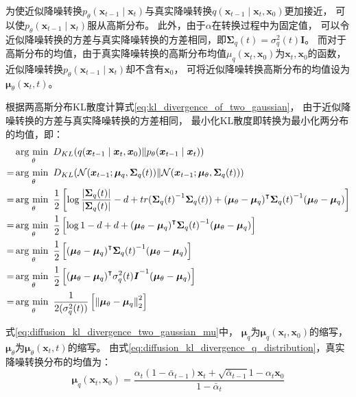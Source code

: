 为使近似降噪转换{$p_{\theta}(\bm{x}_{t-1}\mid \bm{x}_{t})$}与真实降噪转换{$q(\bm{x}_{t-1}\mid \bm{x}_{t},\bm{x}_{0})$}更加接近，
可以使{$p_{\theta}(\bm{x}_{t-1}\mid \bm{x}_{t})$}服从高斯分布。
此外，由于{$\alpha$}在转换过程中为固定值，
可以令近似降噪转换的方差与真实降噪转换的方差相同，即{$\bm{\Sigma}_{q}(t)= \sigma_{q}^{2}(t)\bm{I}$}。
而对于高斯分布的均值，由于真实降噪转换的高斯分布均值{$\mu_{q}(\bm{x}_{t},\bm{x}_{0})$}为{$\bm{x}_{t},\bm{x}_{0}$}的函数，
近似降噪转换{$p_{\theta}(\bm{x}_{t-1}\mid \bm{x}_{t})$}却不含有{$\bm{x}_{0}$}，
可将近似降噪转换高斯分布的均值设为{$\bm{\mu}_{\theta}(\bm{x}_{t},t)$}。

根据两高斯分布KL散度计算式{\ref{eq:kl_divergence_of_two_gaussian}}，
由于近似降噪转换的方差与真实降噪转换的方差相同，
最小化KL散度即转换为最小化两分布的均值，即：
\begin{align}
    &\argmin_{\theta} D_{KL}(q(\bm{x}_{t-1}\mid \bm{x}_{t},\bm{x}_{0}) \Vert p_{\theta}(\bm{x}_{t-1}\mid \bm{x}_{t})  )
    \\=& \argmin_{\theta}  D_{KL}(\mathcal{N}(\bm{x}_{t-1};\bm{\mu}_{q},\bm{\Sigma}_{q}(t))\Vert \mathcal{N}(\bm{x}_{t-1};\bm{\mu}_{\theta},\bm{\Sigma}_{q}(t)))
    \\=& \argmin_{\theta}  \frac{1}{2}\left[
        \log \frac{\left|  \bm{\Sigma}_{q}(t) \right|}{\left|  \bm{\Sigma}_{q}(t) \right|}
        - d
        +tr({\bm{\Sigma}_{q}(t)}^{-1}\bm{\Sigma}_{q}(t))
        +{(\bm{\mu}_{\theta}-\bm{\mu}_{q})}^{\intercal}{\bm{\Sigma}_{q}(t)}^{-1}(\bm{\mu}_{\theta}-\bm{\mu}_{q})
    \right]
    \\=& \argmin_{\theta}  \frac{1}{2}\left[\log 1 -d +d + {(\bm{\mu}_{\theta}-\bm{\mu}_{q})}^{\intercal}{\bm{\Sigma}_{q}(t)}^{-1}(\bm{\mu}_{\theta}-\bm{\mu}_{q})\right]
    \\=& \argmin_{\theta}  \frac{1}{2}\left[{(\bm{\mu}_{\theta}-\bm{\mu}_{q})}^{\intercal}{\bm{\Sigma}_{q}(t)}^{-1}(\bm{\mu}_{\theta}-\bm{\mu}_{q})\right]
    \\=& \argmin_{\theta}  \frac{1}{2}\left[{(\bm{\mu}_{\theta}-\bm{\mu}_{q})}^{\intercal}{\sigma_{q}^{2}(t)\bm{I}}^{-1}(\bm{\mu}_{\theta}-\bm{\mu}_{q})\right]
    \\=& \argmin_{\theta}  \frac{1}{2(\sigma_{q}^{2}(t))}\left[ {\Vert \bm{\mu}_{\theta}-\bm{\mu}_{q} \Vert}_{2}^{2}  \right] \label{eq:diffusion_kl_divergence_two_gaussian_mu}
\end{align}

式{\ref{eq:diffusion_kl_divergence_two_gaussian_mu}}中，
{$\bm{\mu}_{q}$}为{$\bm{\mu}_{q}(\bm{x}_{t},\bm{x}_{0})$}的缩写，
{$\bm{\mu}_{\theta}$}为{$\bm{\mu}_{\theta}(\bm{x}_{t},t)$}的缩写。
由式{\ref{eq:diffusion_kl_divergence_q_distribution}}，真实降噪转换分布的均值为：
\begin{equation}
    \label{diffusion_mu_}
    \bm{\mu}_{q}(\bm{x}_{t},\bm{x}_{0})=\frac{\alpha_{t}(1-\bar{\alpha}_{t-1})\bm{x}_{t} + \sqrt{\bar{\alpha}_{t-1}}1-\alpha_{t}\bm{x}_{0}}{  1-\bar{\alpha}_{t}}
\end{equation}

